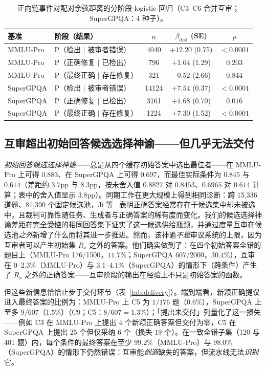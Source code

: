 \documentclass[UTF8,11pt]{ctexart}
\begin{document}
\begin{table}[t]
\centering
\small
\caption{正向链事件对配对余弦距离的分阶段 logistic 回归（C3--C6 合并互审；SuperGPQA：4 种子）。}
\label{tab:stage-reg}
\begin{tabular}{llccc}
\toprule
基准 & 阶段（结果） & $n$ & $\beta_{\mathrm{dist}}$ (SE) & $p$ \\
\midrule
MMLU-Pro & P（检出 $\mid$ 被审者错误）        & 4040 & $+12.20$ (0.75) & $<0.0001$ \\
MMLU-Pro & P（正确修复 $\mid$ 已检出）       & 796  & $+1.64$ (1.29)  & $0.203$ \\
MMLU-Pro & P（最终正确 $\mid$ 存在修复）     & 321  & $-0.52$ (2.66)  & $0.844$ \\
\midrule
SuperGPQA & P（检出 $\mid$ 被审者错误）      & 14124 & $+7.54$ (0.37) & $<0.0001$ \\
SuperGPQA & P（正确修复 $\mid$ 已检出）      & 3161  & $+1.68$ (0.70) & $0.016$ \\
SuperGPQA & P（最终正确 $\mid$ 存在修复）    & 1224  & $+7.30$ (1.52) & $<0.0001$ \\
\bottomrule
\end{tabular}
\end{table}

\subsection{互审超出初始回答候选选择神谕——但几乎无法交付}
\label{sec:oracle}

\emph{初始回答候选选择神谕}——总是从四个缓存初始答案中选出最佳者——在 MMLU-Pro 上可得 $0.883$、在 SuperGPQA 上可得 $0.697$，而最佳实际条件为 $0.845$ 与 $0.614$（差距约 $3.7$pp 与 $8.3$pp，按未舍入值 $0.8827$ 对 $0.8453$、$0.6965$ 对 $0.614$ 计算；表中的舍入值显示 $3.8$pp）。同期工作在更大规模上得到相同诊断：跨 15{,}336 道题、81{,}390 个固定候选池，Ji 等~\cite{ji2026candidate} 表明正确答案经常存在于候选集中却未被选中，且裁判可靠性随任务、生成者与正确答案的稀有度而变化。我们的候选选择神谕差距在完全受控的相同回答集下证实了这一候选供给瓶颈，并通过度量互审在候选池\emph{之外}新增了什么而将其进一步推进。然而，该神谕\emph{不是}审议系统的上限，因为互审者可以产生初始集 $R_x$ 之外的答案。他们确实做到了：在四个初始答案全错的题目上（MMLU-Pro 176/1500，$11.7\%$；SuperGPQA 607/2000，$30.4\%$），互审在 $0$--$2.3\%$（MMLU-Pro）与 $3.1$--$4.1\%$（SuperGPQA）的情形下（跨条件）产生了 $R_x$ 之外的正确答案——互审阶段的输出在经验上不只是初始答案的函数。

但这些新信息恰恰止步于交付环节（表~\ref{tab:delivery}）。端到端看，新颖正确提议进入最终答案的比例为：MMLU-Pro 上 C5 为 $1/176$ 题（$0.6\%$），SuperGPQA 上至多 $9/607$（$1.5\%$）（C9；C5：$8/607 = 1.3\%$）；「提出未交付」列量化了这一损失——例如 C3 在 MMLU-Pro 上提出 $4$ 个新颖正确答案但交付为零，C5 在 SuperGPQA 上提出 $25$ 个但仅采纳 $6$ 个（损失 $19$ 个）。在一致全错子集（120 与 401 题）内，每个条件的最终答案在至少 $99.2\%$（MMLU-Pro）与 $98.0\%$（SuperGPQA）的情形下仍然错误：互审能\emph{创造}缺失的答案，但流水线无法\emph{识别}它。
\end{document}
